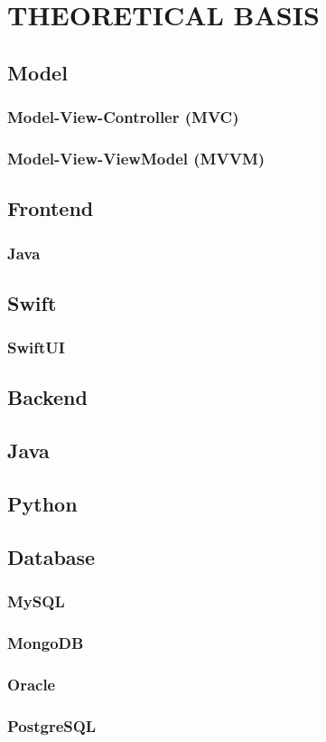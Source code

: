 \section{THEORETICAL BASIS}

\subsection{Model}

\subsubsection{Model-View-Controller (MVC)}

\subsubsection{Model-View-ViewModel (MVVM)}

\subsection{Frontend}

\subsubsection{Java}

\subsection{Swift}

\subsubsection{SwiftUI}

\subsection{Backend}

\subsection{Java}

\subsection{Python}

\subsection{Database}

\subsubsection{MySQL}

\subsubsection{MongoDB}

\subsubsection{Oracle}

\subsubsection{PostgreSQL}